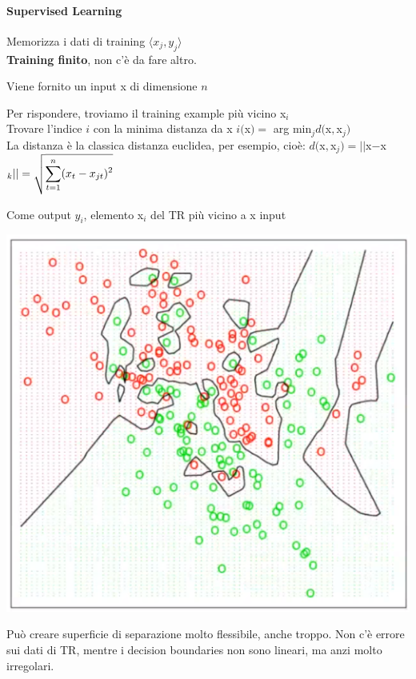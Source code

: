 \documentclass[10pt]{book}
\begin{document}
\paragraph{Supervised Learning} 
\begin{list}{}{Alcune definizioni}
	\item Memorizza i dati di training $\langle x_j, y_j\rangle$\\
	\textbf{Training finito}, non c'è da fare altro.
	\item Viene fornito un input x di dimensione $n$
	\item Per rispondere, troviamo il training example più vicino x$_i$\\
	Trovare l'indice $i$ con la minima distanza da x $i($x$) =$ arg min$_j d($x$, $x$_j)$\\
	La distanza è la classica distanza euclidea, per esempio, cioè: $d($x$, $x$_j) = ||$x$ - $x$_k|| = \sqrt{\mathlarger{\sum_{t=1}^n (x_t - x_{jt})^2}}$
	\item Come output $y_i$, elemento x$_i$ del TR più vicino a x input
\end{list}
\begin{center}
	\includegraphics[scale=0.75]{ml1nn.png}
\end{center}
Può creare superficie di separazione molto flessibile, anche troppo. Non c'è errore sui dati di TR, mentre i decision boundaries non sono lineari, ma anzi molto irregolari.
\pagebreak
\end{document}

